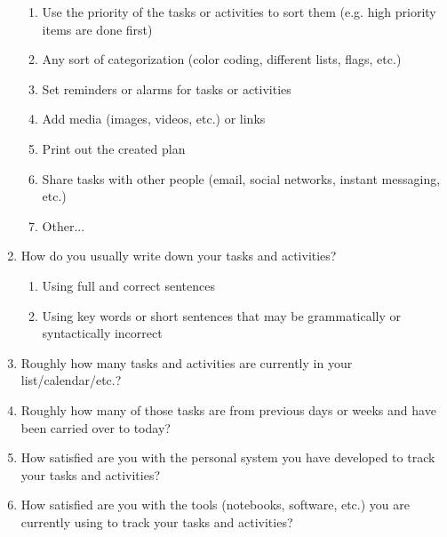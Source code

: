 \begin{enumerate}
\begin{enumerate}
            \item Use the priority of the tasks or activities to sort them (e.g. high priority items are done first)
            \item Any sort of categorization (color coding, different lists, flags, etc.)
            \item Set reminders or alarms for tasks or activities
            \item Add media (images, videos, etc.) or links
            \item Print out the created plan
            \item Share tasks with other people (email, social networks, instant messaging, etc.)
            \item Other...
        \end{enumerate}
    \item How do you usually write down your tasks and activities?
        \begin{enumerate}
            \item Using full and correct sentences
            \item Using key words or short sentences that may be grammatically or syntactically incorrect
        \end{enumerate}
    \item Roughly how many tasks and activities are currently in your list/calendar/etc.?
    \item Roughly how many of those tasks are from previous days or weeks and have been carried over to today?
    \item How satisfied are you with the personal system you have developed to track your tasks and activities?
    \item How satisfied are you with the tools (notebooks, software, etc.) you are currently using to track your tasks and activities?
\end{enumerate}

